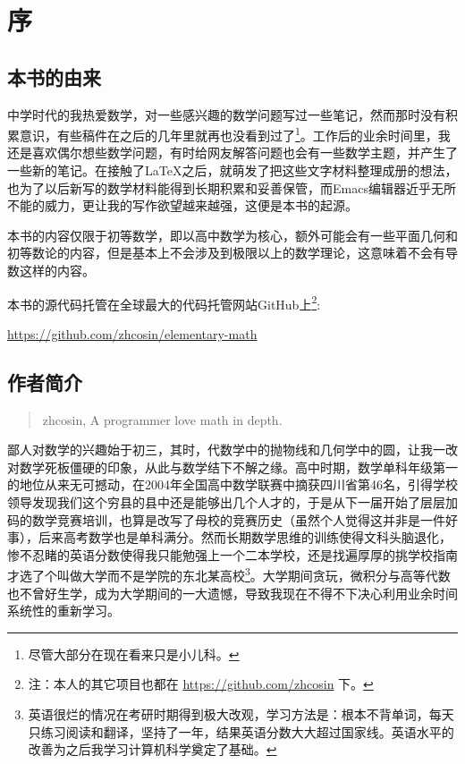 
\chapter*{序}


\section{本书的由来}

中学时代的我热爱数学，对一些感兴趣的数学问题写过一些笔记，然而那时没有积累意识，有些稿件在之后的几年里就再也没看到过了\footnote{尽管大部分在现在看来只是小儿科。}。工作后的业余时间里，我还是喜欢偶尔想些数学问题，有时给网友解答问题也会有一些数学主题，并产生了一些新的笔记。在接触了LaTeX之后，就萌发了把这些文字材料整理成册的想法，也为了以后新写的数学材料能得到长期积累和妥善保管，而Emacs编辑器近乎无所不能的威力，更让我的写作欲望越来越强，这便是本书的起源。

本书的内容仅限于初等数学，即以高中数学为核心，额外可能会有一些平面几何和初等数论的内容，但是基本上不会涉及到极限以上的数学理论，这意味着不会有导数这样的内容。

本书的源代码托管在全球最大的代码托管网站GitHub上\footnote{注：本人的其它项目也都在 \href{https://github.com/zhcosin}{https://github.com/zhcosin} 下。}:
\begin{center}
\href{https://github.com/zhcosin/elementary-math}{https://github.com/zhcosin/elementary-math}
\end{center}

\section{作者简介}
\begin{quotation}
zhcosin, A programmer love math in depth.
\end{quotation}

鄙人对数学的兴趣始于初三，其时，代数学中的抛物线和几何学中的圆，让我一改对数学死板僵硬的印象，从此与数学结下不解之缘。高中时期，数学单科年级第一的地位从来无可撼动，在2004年全国高中数学联赛中摘获四川省第46名，引得学校领导发现我们这个穷县的县中还是能够出几个人才的，于是从下一届开始了层层加码的数学竞赛培训，也算是改写了母校的竞赛历史（虽然个人觉得这并非是一件好事），后来高考数学也是单科满分。然而长期数学思维的训练使得文科头脑退化，惨不忍睹的英语分数使得我只能勉强上一个二本学校，还是找遍厚厚的挑学校指南才选了个叫做大学而不是学院的东北某高校\footnote{英语很烂的情况在考研时期得到极大改观，学习方法是：根本不背单词，每天只练习阅读和翻译，坚持了一年，结果英语分数大大超过国家线。英语水平的改善为之后我学习计算机科学奠定了基础。}。大学期间贪玩，微积分与高等代数也不曾好生学，成为大学期间的一大遗憾，导致我现在不得不下决心利用业余时间系统性的重新学习。

